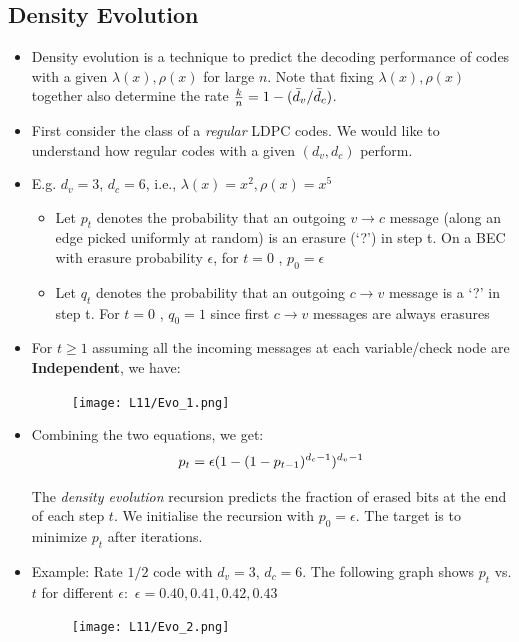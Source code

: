 \documentclass[12pt]{article}
\begin{document}
\subsection{Density Evolution}
\begin{itemize}
    \item Density evolution is a technique to predict the decoding performance of codes with a given $\lambda(x),\rho(x)$ for large $n$. Note that fixing $\lambda(x),\rho(x)$ together also determine the rate $\frac{k}{n} = 1 - (\Bar{d}_v / \Bar{d}_c)$.
    \item First consider the class of a \textit{regular} LDPC codes. We would like to understand how regular codes with a given $(d_v,d_c)$ perform. 
    \item E.g. $d_v = 3$, $d_c = 6$, i.e., $\lambda(x) =x^2, \rho(x) =x^5$
    \begin{itemize}
        \item Let $p_t$ denotes the probability that an outgoing $v\rightarrow c$ message (along an edge picked uniformly at random) is an erasure (`?') in step t. On a BEC with erasure probability $\epsilon$, for $t=0$ , $p_0 = \epsilon$   
        \item Let $q_t$ denotes the probability that an outgoing $c\rightarrow v$ message is a `?' in step t.
        For $t=0$ , $q_0 = 1$ since first $c\rightarrow v$ messages are always erasures
    \end{itemize}
    \item For $t \ge 1$ assuming all the incoming messages at each variable/check node are \textbf{Independent}, we have:
    \begin{figure}[H]
    \centering
    \texttt{[image: L11/Evo\_1.png]}
    \end{figure}
    \item Combining the two equations, we get:
    \[
    \large p_t = \epsilon(1-(1-p_{t-1})^{d_c-1})^{d_v-1}
    \]
    \begin{center}
    The \textit{density evolution} recursion predicts the fraction of erased bits at the end of each step $t$. We initialise the recursion with $p_0 = \epsilon$. The target is to minimize $p_t$ after iterations.
    \end{center}
    \item Example: Rate $1/2$ code with $d_v =3$, $d_c = 6$. The following graph shows $p_t$ vs. $t$ for different $\epsilon:$ $\epsilon = 0.40, 0.41, 0.42, 0.43$
    \begin{figure}[H]
    \centering
    \texttt{[image: L11/Evo\_2.png]}

\end{figure}
\end{itemize}
\end{document}

